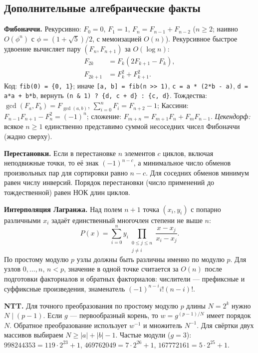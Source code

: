 \subsection{Дополнительные алгебраические факты}
\textbf{Фибоначчи.} Рекурсивно: $F_0=0$, $F_1=1$, $F_n=F_{n-1}+F_{n-2}$ ($n\ge2$; наивно $O(\phi^n)$ с $\phi=(1+\sqrt5)/2$, с мемоизацией $O(n)$).
Рекурсивное быстрое удвоение вычисляет пару $(F_n,F_{n+1})$ за $O(\log n)$:
\[
  \begin{aligned}
    F_{2k}&=F_k(2F_{k+1}-F_k),\\
    F_{2k+1}&=F_k^2+F_{k+1}^2.
  \end{aligned}
\]
Код: \texttt{fib(0) = \{0, 1\}}; иначе \texttt{[a, b] = fib(n >{}> 1)}, \texttt{c = a * (2*b - a)}, \texttt{d = a*a + b*b}, вернуть \texttt{(n \& 1) ? \{d, c + d\} : \{c, d\}}.
Тождества: $\gcd(F_a,F_b)=F_{\gcd(a,b)}$, $\sum_{i=0}^n F_i=F_{n+2}-1$; Кассини: $F_{n-1}F_{n+1}-F_n^2=(-1)^n$; сложение: $F_{m+n}=F_{m+1}F_n+F_mF_{n-1}$.
\emph{Цекендорф:} всякое $n\ge1$ единственно представимо суммой несоседних чисел Фибоначчи (жадно сверху).

\textbf{Перестановки.} Если в перестановке $n$ элементов $c$ циклов, включая неподвижные точки, то её знак $(-1)^{n-c}$, а минимальное число обменов произвольных пар для сортировки равно $n-c$.
Для соседних обменов минимум равен числу инверсий.
Порядок перестановки (число применений до тождественной) равен НОК длин циклов.

\textbf{Интерполяция Лагранжа.} Над полем $n+1$ точка $(x_i,y_i)$ с попарно различными $x_i$ задаёт единственный многочлен степени не выше $n$:
\[
  P(x)=\sum_{i=0}^{n} y_i
    \prod_{\substack{0\le j\le n\\j\ne i}}
      \frac{x-x_j}{x_i-x_j}.
\]
По простому модулю $p$ узлы должны быть различны именно по модулю $p$. Для узлов $0,\dots,n$, $n<p$, значение в одной точке считается за $O(n)$ после подготовки факториалов и обратных факториалов: числители --- префиксные и суффиксные произведения, знаменатель $(-1)^{n-i}i!(n-i)!$.

\textbf{NTT.} Для точного преобразования по простому модулю $p$ длины $N=2^k$ нужно $N\mid(p-1)$. Если $g$ --- первообразный корень, то $w=g^{(p-1)/N}$ имеет порядок $N$.
Обратное преобразование использует $w^{-1}$ и множитель $N^{-1}$.
Для свёртки двух массивов выбираем $N\ge |a|+|b|-1$.
Частые модули ($g=3$): $998244353=119\cdot2^{23}+1$, $469762049=7\cdot2^{26}+1$, $167772161=5\cdot2^{25}+1$.
\endgroup
